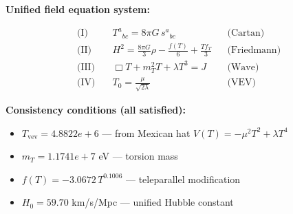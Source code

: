 
\textbf{Unified field equation system:}

\begin{align}
  \text{(I)} \quad & T^a{}_{bc} = 8\pi G \, s^a{}_{bc} && \text{(Cartan)} \\
  \text{(II)} \quad & H^2 = \frac{8\pi G}{3}\rho - \frac{f(T)}{6} + \frac{Tf_T}{3} && \text{(Friedmann)} \\
  \text{(III)} \quad & \Box T + m_T^2 T + \lambda T^3 = J && \text{(Wave)} \\
  \text{(IV)} \quad & T_0 = \frac{\mu}{\sqrt{2\lambda}} && \text{(VEV)}
\end{align}

\textbf{Consistency conditions (all satisfied):}
\begin{itemize}
  \item $T_{\text{vev}} = 4.8822e+6$ — from Mexican hat $V(T) = -\mu^2 T^2 + \lambda T^4$
  \item $m_T = 1.1741e+7$ eV — torsion mass
  \item $f(T) = -3.0672 \, T^{0.1006}$ — teleparallel modification
  \item $H_0 = 59.70$ km/s/Mpc — unified Hubble constant
\end{itemize}